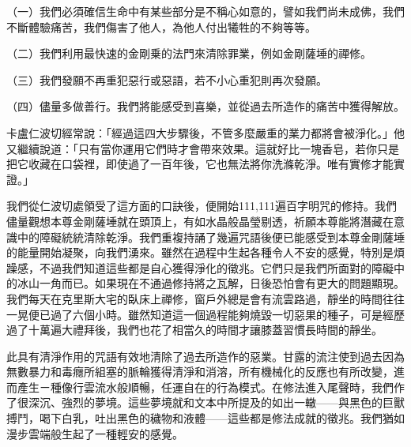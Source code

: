 （一）我們必須確信生命中有某些部分是不稱心如意的，譬如我們尚未成佛，我們不斷體驗痛苦，我們傷害了他人，為他人付出犧牲的不夠等等。

（二）我們利用最快速的金剛乗的法門來清除罪業，例如金剛薩埵的禪修。

（三）我們發願不再重犯惡行或惡語，若不小心重犯則再次發願。

（四）儘量多做善行。我們將能感受到喜樂，並從過去所造作的痛苦中獲得解放。

卡盧仁波切經常說：「經過這四大步驟後，不管多麼嚴重的業力都將會被淨化。」他又繼續說道：「只有當你運用它們時才會帶來效果。這就好比一塊香皂，若你只是把它收藏在口袋裡，即使過了一百年後，它也無法將你洗滌乾淨。唯有實修才能實證。」

我們從仁波切處領受了這方面的口訣後，便開始111,111遍百字明咒的修持。我們儘量觀想本尊金剛薩埵就在頭頂上，有如水晶般晶瑩剔透，祈願本尊能將潛藏在意識中的障礙統統清除乾淨。我們重複持誦了幾遍咒語後便已能感受到本尊金剛薩埵的能量開始凝聚，向我們湧來。雖然在過程中生起各種令人不安的感覺，特別是煩躁感，不過我們知道這些都是自心獲得淨化的徵兆。它們只是我們所面對的障礙中的冰山一角而已。如果現在不通過修持將之瓦解，日後恐怕會有更大的問題顯現。我們每天在克里斯大宅的臥床上禪修，窗戶外總是會有流雲路過，靜坐的時間往往一晃便已過了六個小時。雖然知道這一個過程能夠燒毀一切惡果的種子，可是經歷過了十萬遍大禮拜後，我們也花了相當久的時間才讓膝蓋習慣長時間的靜坐。

此具有清淨作用的咒語有效地清除了過去所造作的惡業。甘露的流注使到過去因為無數暴力和毒癮所組塞的脈輪獲得清淨和消溶，所有機械化的反應也有所改變，進而產生ㄧ種像行雲流水般順暢，任運自在的行為模式。在修法進入尾聲時，我們作了很深沉、強烈的夢境。這些夢境就和文本中所提及的如出一轍——與黑色的巨獸搏鬥，喝下白乳，吐出黑色的穢物和液體——這些都是修法成就的徵兆。我們猶如漫步雲端般生起了一種輕安的感覺。
